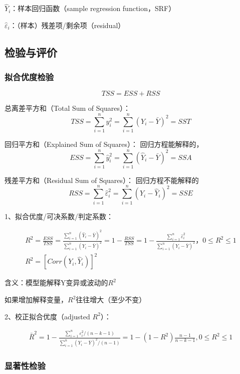 \documentclass[12pt]{book}
\begin{document}
\par ${\hat{Y}}_i$：样本回归函数（sample regression function，SRF）
\par ${\hat{\varepsilon}}_i$：（样本）残差项/剩余项（residual）

\subsection{检验与评价}

\subsubsection{拟合优度检验}

$$
TSS=ESS+RSS
$$

\par 总离差平方和（Total Sum of Squares）：  
$$ TSS=\sum_{i=1}^{n}y_i^2=\sum_{i=1}^{n}\left(Y_i-\bar{Y}\right)^2=SST $$  
\par 回归平方和（Explained Sum of Squares）： 回归方程能解释的，  
$$ ESS=\sum_{i=1}^{n}{\hat{y}}_i^2=\sum_{i=1}^{n}\left({\hat{Y}}_i-\bar{Y}\right)^2=SSA $$
\par 残差平方和（Residual Sum of Squares）： 回归方程不能解释的  
$$ RSS=\sum_{i=1}^{n}{\hat{\varepsilon}}_i^2=\sum_{i=1}^{n}\left(Y_i-{\hat{Y}}_i\right)^2=SSE $$


1、拟合优度/可决系数/判定系数：

\begin{gather*}
R^2=\frac{ESS}{TSS} 
=\frac{\sum_{i=1}^{n}\left({\hat{Y}}_i-\bar{Y}\right)^2}{\sum_{i=1}^{n}\left(Y_i-\bar{Y}\right)^2} 
=1-\frac{RSS}{TSS}
=1-\frac{\sum_{i=1}^{n}{\hat{\varepsilon}}_i^2}{\sum_{i=1}^{n}\left(Y_i-\bar{Y}\right)^2}，0≤R^2≤1 \\ 
R^2=\left[Corr\left(Y_i,{\hat{Y}}_i\right)\right]^2
\end{gather*}


\par 含义：模型能解释Y变异或波动的$R^2$  
\par 如果增加解释变量，$R^2$往往增大（至少不变）

2、校正拟合优度（adjusted $R^2$）：

\begin{gather*}
    {\bar{R}}^2 
=1-\frac{\sum_{i=1}^{n}{\varepsilon_i^2/(n-k-1)}}{\sum_{i=1}^{n}{(Y_i-\bar{Y})^2}/(n-1)} 
=1-(1-R^2)\frac{n-1}{n-k-1}, 0\leqslant R^2\leqslant 1
\end{gather*}


\subsubsection{显著性检验}
\end{document}
